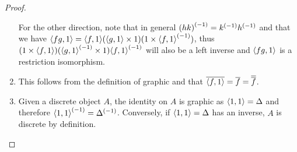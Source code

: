 \begin{proof}
\begin{enumerate}[{(}i{)}]
    For the other direction, note that in general ${(h k)}^{(-1)} = {k}^{(-1)}{h}^{(-1)}$ and that
    we have $\langle f g,1\rangle = \langle f,1\rangle (\langle g,1\rangle\times 1)  (1 \times {\langle f,1\rangle}^{(-1)})$, thus
    $(1\times \langle f,1\rangle)  ({\langle g,1\rangle}^{(-1)}\times 1) {\langle f,1\rangle}^{(-1)}$ will also be a left inverse and
    $\langle f g,1\rangle$ is a restriction isomorphism.

    \item This follows from the definition of graphic and that
       $\overline{\langle f,1\rangle} = \overline{f} = \overline{\overline{f}}$.

    \item Given a discrete object $A$, the identity on $A$ is graphic as $\langle1,1\rangle = \Delta$
      and therefore ${\langle1,1\rangle}^{(-1)} = {\Delta}^{(-1)}$. Conversely, if $\langle1,1\rangle = \Delta$ has an
      inverse, $A$ is discrete by definition.
  \end{enumerate}
\end{proof}

